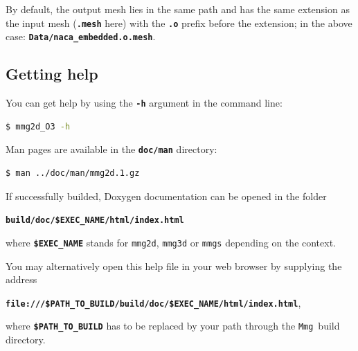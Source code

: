 \documentclass{article}
\newcommand{\ttb}[1]{\texttt{\textbf{#1}}}
\newcommand{\mmg}{\texttt{Mmg}}
\begin{document}
By default, the output mesh lies in the same path and has the same
extension as the input mesh (\ttb{.mesh} here) with the \ttb{.o}
prefix before the extension; in the above case: \ttb{Data/naca\_embedded.o.mesh}.

\subsection{Getting help}

You can get help by using the \ttb{-h} argument in the command line:
\begin{lstlisting}[language=bash]
$ mmg2d_O3 -h
\end{lstlisting}
%
Man pages are available in the \ttb{doc/man} directory:
\begin{lstlisting}[language=bash]
$ man ../doc/man/mmg2d.1.gz
\end{lstlisting}

If successfully builded, Doxygen documentation can be opened in the folder
\begin{center}
\ttb{build/doc/\$EXEC\_NAME/html/index.html} 
\end{center}
where
\ttb{\$EXEC\_NAME} stands for \texttt{mmg2d}, \texttt{mmg3d} or \texttt{mmgs} depending on the context. 

You may alternatively open this help file in your
web browser by supplying the address 
\begin{center} 
\ttb{file:///\$PATH\_TO\_BUILD/build/doc/\$EXEC\_NAME/html/index.html},
\end{center}
where \ttb{\$PATH\_TO\_BUILD} has to be replaced by your path through
the \mmg\ build directory.
\end{document}
